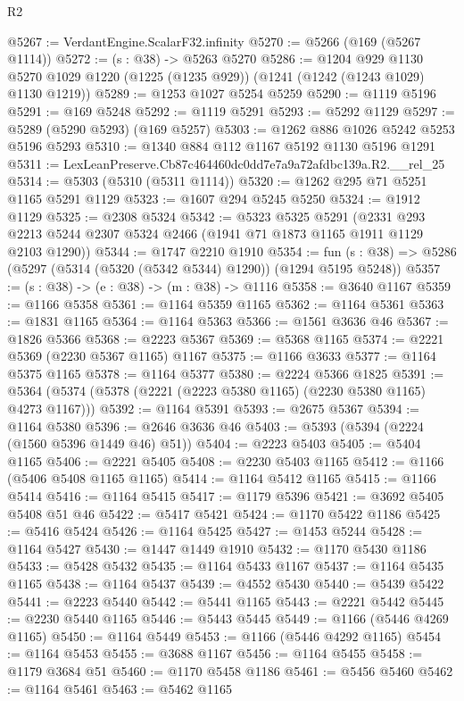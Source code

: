 \begin{lexlean}{R2}
\begin{coremodule}
@5267 := VerdantEngine.ScalarF32.infinity
@5270 := @5266 (@169 (@5267 @1114))
@5272 := (s : @38) -> @5263 @5270
@5286 := @1204
    @929
    @1130
    @5270
    @1029
    @1220
    (@1225 (@1235 @929))
    (@1241 (@1242 (@1243 @1029) @1130 @1219))
@5289 := @1253 @1027 @5254 @5259
@5290 := @1119 @5196
@5291 := @169 @5248
@5292 := @1119 @5291
@5293 := @5292 @1129
@5297 := @5289 (@5290 @5293) (@169 @5257)
@5303 := @1262 @886 @1026 @5242 @5253 @5196 @5293
@5310 := @1340 @884 @112 @1167 @5192 @1130 @5196 @1291
@5311 := LexLeanPreserve.Cb87c464460dc0dd7e7a9a72afdbc139a.R2.__rel_25
@5314 := @5303 (@5310 (@5311 @1114))
@5320 := @1262 @295 @71 @5251 @1165 @5291 @1129
@5323 := @1607 @294 @5245 @5250
@5324 := @1912 @1129
@5325 := @2308 @5324
@5342 := @5323
    @5325
    @5291
    (@2331 @293 @2213 @5244 @2307 @5324 @2466 (@1941 @71 @1873 @1165 @1911 @1129 @2103 @1290))
@5344 := @1747 @2210 @1910
@5354 := fun (s : @38) => @5286 (@5297 (@5314 (@5320 (@5342 @5344) @1290)) (@1294 @5195 @5248))
@5357 := (s : @38) -> (e : @38) -> (m : @38) -> @1116
@5358 := @3640 @1167
@5359 := @1166 @5358
@5361 := @1164 @5359 @1165
@5362 := @1164 @5361
@5363 := @1831 @1165
@5364 := @1164 @5363
@5366 := @1561 @3636 @46
@5367 := @1826 @5366
@5368 := @2223 @5367
@5369 := @5368 @1165
@5374 := @2221 @5369 (@2230 @5367 @1165) @1167
@5375 := @1166 @3633
@5377 := @1164 @5375 @1165
@5378 := @1164 @5377
@5380 := @2224 @5366 @1825
@5391 := @5364 (@5374 (@5378 (@2221 (@2223 @5380 @1165) (@2230 @5380 @1165) @4273 @1167)))
@5392 := @1164 @5391
@5393 := @2675 @5367
@5394 := @1164 @5380
@5396 := @2646 @3636 @46
@5403 := @5393 (@5394 (@2224 (@1560 @5396 @1449 @46) @51))
@5404 := @2223 @5403
@5405 := @5404 @1165
@5406 := @2221 @5405
@5408 := @2230 @5403 @1165
@5412 := @1166 (@5406 @5408 @1165 @1165)
@5414 := @1164 @5412 @1165
@5415 := @1166 @5414
@5416 := @1164 @5415
@5417 := @1179 @5396
@5421 := @3692 @5405 @5408 @51 @46
@5422 := @5417 @5421
@5424 := @1170 @5422 @1186
@5425 := @5416 @5424
@5426 := @1164 @5425
@5427 := @1453 @5244
@5428 := @1164 @5427
@5430 := @1447 @1449 @1910
@5432 := @1170 @5430 @1186
@5433 := @5428 @5432
@5435 := @1164 @5433 @1167
@5437 := @1164 @5435 @1165
@5438 := @1164 @5437
@5439 := @4552 @5430
@5440 := @5439 @5422
@5441 := @2223 @5440
@5442 := @5441 @1165
@5443 := @2221 @5442
@5445 := @2230 @5440 @1165
@5446 := @5443 @5445
@5449 := @1166 (@5446 @4269 @1165)
@5450 := @1164 @5449
@5453 := @1166 (@5446 @4292 @1165)
@5454 := @1164 @5453
@5455 := @3688 @1167
@5456 := @1164 @5455
@5458 := @1179 @3684 @51
@5460 := @1170 @5458 @1186
@5461 := @5456 @5460
@5462 := @1164 @5461
@5463 := @5462 @1165

\end{coremodule}
\end{lexlean}

